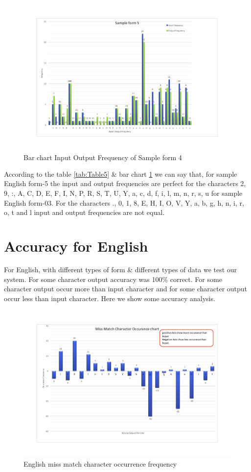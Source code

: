 \begin{figure}[H]
\centering
\includegraphics[width=1\textwidth]{form5.pdf}
\caption {Bar chart Input Output Frequency of Sample form 4}
\label {fig:bar5}
\end{figure}
According to the table \ref{tab:Table5} \& bar chart \ref{fig:bar5} we can say that, for sample English form-5 the input and output frequencies are perfect for the characters 2, 9, :, A, C, D, E, F, I, N, P, R, S, T, U, Y, a, c, d, f, i, l, m, n, r, s, u for sample English form-03. For the characters ., 0, 1, 8, E, H, I, O, V, Y, a, b, g, h, n, i, r, o, t and l input and output frequencies are not equal. 
\section{Accuracy for English}
For English, with different types of form \& different types of data we test our system. For some character output accuracy was 100\% correct. For some character output occur more than input character and for some character output occur less than input character. Here we show some accuracy analysis.

\begin{figure}[H]
\centering
\includegraphics[width=1\textwidth]{EOccurance.pdf}
\caption {English miss match character occurrence frequency}
\label {fig:Accuracy}
\end{figure}

